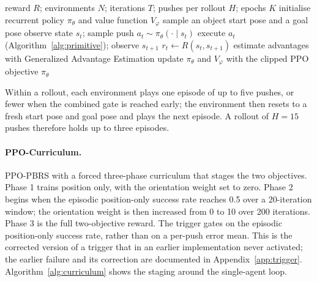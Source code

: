 \begin{algorithm}[H]
\caption{Single-agent training (PPO-Baseline and PPO-PBRS).}
\label{alg:single}
\begin{algorithmic}[1]
\Require reward $R$; environments $N$; iterations $T$; pushes per rollout $H$; epochs $K$
\State initialise recurrent policy $\pi_\theta$ and value function $V_\varphi$
        \State sample an object start pose and a goal pose
            \State observe state $s_t$; sample push $a_t \sim \pi_\theta(\cdot \mid s_t)$
            \State execute $a_t$ (Algorithm~\ref{alg:primitive}); observe $s_{t+1}$
            \State $r_t \gets R(s_t, s_{t+1})$
        \EndFor
    \EndFor
    \State estimate advantages with Generalized Advantage Estimation
        \State update $\pi_\theta$ and $V_\varphi$ with the clipped PPO objective
    \EndFor
\EndFor
\State \Return $\pi_\theta$
\end{algorithmic}
\end{algorithm}

Within a rollout, each environment plays one episode of up to five pushes, or
fewer when the combined gate is reached early; the environment then resets to a
fresh start pose and goal pose and plays the next episode. A rollout of $H = 15$
pushes therefore holds up to three episodes.

\paragraph{PPO-Curriculum.}
PPO-PBRS with a forced three-phase curriculum that stages the two objectives.
Phase 1 trains position only, with the orientation weight set to zero. Phase 2
begins when the episodic position-only success rate reaches 0.5 over a
20-iteration window; the orientation weight is then increased from 0 to 10 over
200 iterations. Phase 3 is the full two-objective reward. The trigger gates on the
episodic position-only success rate, rather than on a per-push error mean. This is
the corrected version of a trigger that in an earlier implementation never
activated; the earlier failure and its correction are documented in
Appendix~\ref{app:trigger}.
Algorithm~\ref{alg:curriculum} shows the staging around the single-agent loop.

